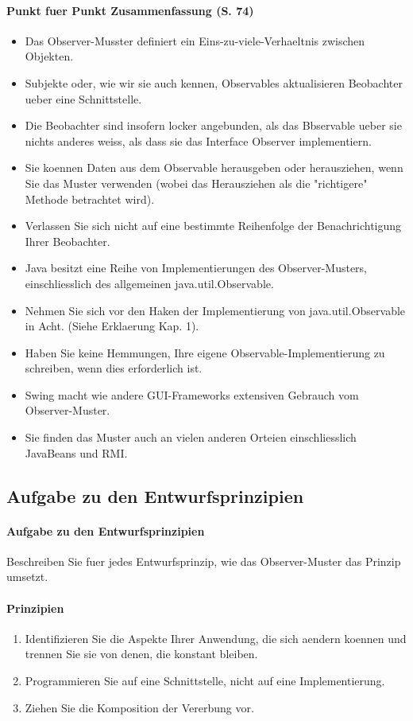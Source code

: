 \paragraph{Punkt fuer Punkt Zusammenfassung (S. 74)}
\begin{itemize}
\item Das Observer-Musster definiert ein Eins-zu-viele-Verhaeltnis zwischen Objekten.
\item Subjekte oder, wie wir sie auch kennen, Observables aktualisieren Beobachter ueber eine 
  Schnittstelle.
\item Die Beobachter sind insofern locker angebunden, als das Bbservable ueber sie nichts anderes 
  weiss, als dass sie das Interface Observer implementiern. 
\item Sie koennen Daten aus dem Observable herausgeben oder herausziehen, wenn Sie das Muster 
  verwenden (wobei das Herausziehen als die "richtigere" Methode betrachtet wird). 
\item Verlassen Sie sich nicht auf eine bestimmte Reihenfolge der Benachrichtigung Ihrer Beobachter. 
\item Java besitzt eine Reihe von Implementierungen des Observer-Musters, einschliesslich des 
  allgemeinen java.util.Observable.
\item Nehmen Sie sich vor den Haken der Implementierung von java.util.Observable in Acht. (Siehe 
  Erklaerung Kap. 1).
\item Haben Sie keine Hemmungen, Ihre eigene Observable-Implementierung zu schreiben, wenn dies 
  erforderlich ist.
\item Swing macht wie andere GUI-Frameworks extensiven Gebrauch vom Observer-Muster.
\item Sie finden das Muster auch an vielen anderen Orteien einschliesslich JavaBeans und RMI. 
\end{itemize}

\subsection{Aufgabe zu den Entwurfsprinzipien}
\paragraph{Aufgabe zu den Entwurfsprinzipien}
Beschreiben Sie fuer jedes Entwurfsprinzip, wie das Observer-Muster das Prinzip umsetzt. 

\paragraph{Prinzipien}
\begin{enumerate}
\item Identifizieren Sie die Aspekte Ihrer Anwendung, die sich aendern koennen und trennen Sie sie 
   von denen, die konstant bleiben.
\item Programmieren Sie auf eine Schnittstelle, nicht auf eine Implementierung.
\item Ziehen Sie die Komposition der Vererbung vor.
\end{enumerate}

